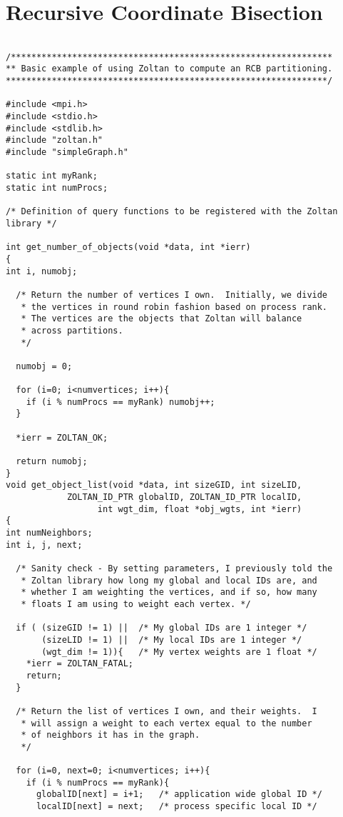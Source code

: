 \newpage
\section{Recursive Coordinate Bisection}

\begin{verbatim}

/***************************************************************
** Basic example of using Zoltan to compute an RCB partitioning.
***************************************************************/

#include <mpi.h>
#include <stdio.h>
#include <stdlib.h>
#include "zoltan.h"
#include "simpleGraph.h"

static int myRank;
static int numProcs;

/* Definition of query functions to be registered with the Zoltan library */

int get_number_of_objects(void *data, int *ierr)
{
int i, numobj;

  /* Return the number of vertices I own.  Initially, we divide
   * the vertices in round robin fashion based on process rank.
   * The vertices are the objects that Zoltan will balance
   * across partitions.
   */

  numobj = 0;

  for (i=0; i<numvertices; i++){
    if (i % numProcs == myRank) numobj++;
  }

  *ierr = ZOLTAN_OK;

  return numobj;
}
void get_object_list(void *data, int sizeGID, int sizeLID,
            ZOLTAN_ID_PTR globalID, ZOLTAN_ID_PTR localID,
                  int wgt_dim, float *obj_wgts, int *ierr)
{
int numNeighbors;
int i, j, next;

  /* Sanity check - By setting parameters, I previously told the
   * Zoltan library how long my global and local IDs are, and
   * whether I am weighting the vertices, and if so, how many
   * floats I am using to weight each vertex. */

  if ( (sizeGID != 1) ||  /* My global IDs are 1 integer */
       (sizeLID != 1) ||  /* My local IDs are 1 integer */
       (wgt_dim != 1)){   /* My vertex weights are 1 float */
    *ierr = ZOLTAN_FATAL;
    return;
  }

  /* Return the list of vertices I own, and their weights.  I 
   * will assign a weight to each vertex equal to the number
   * of neighbors it has in the graph.
   */

  for (i=0, next=0; i<numvertices; i++){
    if (i % numProcs == myRank){
      globalID[next] = i+1;   /* application wide global ID */
      localID[next] = next;   /* process specific local ID */


\end{verbatim}
